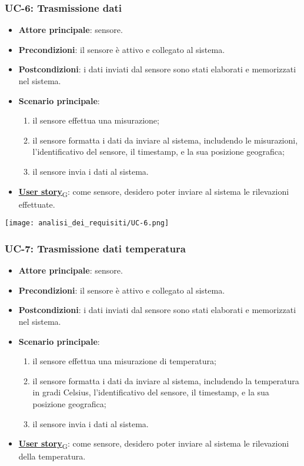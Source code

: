\subsubsection{UC-6: Trasmissione dati}
\begin{itemize}
	\item \textbf{Attore principale}: sensore.
	\item \textbf{Precondizioni}: il sensore è attivo e collegato al sistema.
	\item \textbf{Postcondizioni}: i dati inviati dal sensore sono stati elaborati e memorizzati nel sistema.
	\item \textbf{Scenario principale}:
	      \begin{enumerate}
		      \item il sensore effettua una misurazione;
		      \item il sensore formatta i dati da inviare al sistema, includendo le misurazioni, l'identificativo del sensore, il timestamp, e la sua posizione geografica;
		      \item il sensore invia i dati al sistema.
	      \end{enumerate}
	\item \href{https://7last.github.io/docs/pb/documentazione-interna/glossario\#user-story}{\textbf{User story}\textsubscript{G}}: come sensore, desidero poter inviare al sistema le rilevazioni effettuate.
\end{itemize}

\begin{center}
	\texttt{[image: analisi\_dei\_requisiti/UC-6.png]}
\end{center}

\subsubsection{UC-7: Trasmissione dati temperatura}
\begin{itemize}
	\item \textbf{Attore principale}: sensore.
	\item \textbf{Precondizioni}: il sensore è attivo e collegato al sistema.
	\item \textbf{Postcondizioni}: i dati inviati dal sensore sono stati elaborati e memorizzati nel sistema.
	\item \textbf{Scenario principale}:
	      \begin{enumerate}
		      \item il sensore effettua una misurazione di temperatura;
		      \item il sensore formatta i dati da inviare al sistema, includendo la temperatura in gradi Celsius, l'identificativo del sensore,
		            il timestamp, e la sua posizione geografica;
		      \item il sensore invia i dati al sistema.
	      \end{enumerate}
	\item \href{https://7last.github.io/docs/pb/documentazione-interna/glossario\#user-story}{\textbf{User story}\textsubscript{G}}: come sensore, desidero poter inviare al sistema le rilevazioni della temperatura.
\end{itemize}

